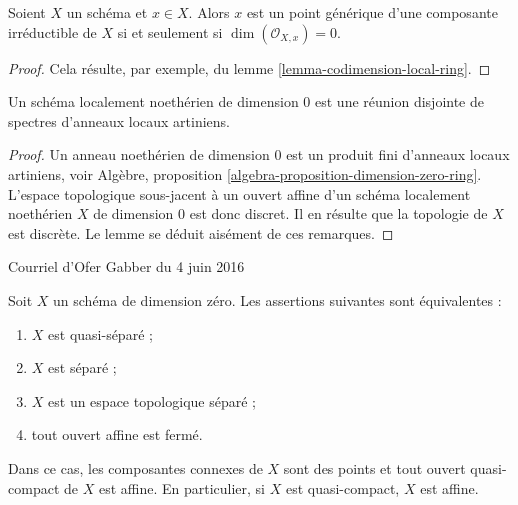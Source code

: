 \begin{lemma}
\label{lemma-generic-point}
Soient $X$ un schéma et $x \in X$. Alors $x$ est un point générique
d'une composante irréductible de $X$ si et seulement si $\dim(\mathcal{O}_{X, x}) = 0$.
\end{lemma}

\begin{proof}
Cela résulte, par exemple, du lemme \ref{lemma-codimension-local-ring}.
\end{proof}

\begin{lemma}
\label{lemma-locally-Noetherian-dimension-0}
Un schéma localement noethérien de dimension $0$ est une réunion
disjointe de spectres d'anneaux locaux artiniens.
\end{lemma}

\begin{proof}
Un anneau noethérien de dimension $0$ est un produit fini d'anneaux locaux
artiniens,
voir Algèbre, proposition \ref{algebra-proposition-dimension-zero-ring}.
L'espace topologique sous-jacent à un ouvert affine d'un schéma localement noethérien $X$ de dimension
$0$ est donc discret. Il en résulte que la
topologie de $X$ est discrète. Le lemme se déduit aisément de ces
remarques.
\end{proof}

\begin{lemma}
\label{lemma-dimension-zero}
\begin{reference}
Courriel d'Ofer Gabber du 4 juin 2016
\end{reference}
Soit $X$ un schéma de dimension zéro. Les assertions suivantes sont équivalentes :
\begin{enumerate}
\item $X$ est quasi-séparé ;
\item $X$ est séparé ;
\item $X$ est un espace topologique séparé ;
\item tout ouvert affine est fermé.
\end{enumerate}
Dans ce cas, les composantes connexes de $X$ sont des points et tout
ouvert quasi-compact de $X$ est affine. En particulier, si $X$
est quasi-compact, $X$ est affine.
\end{lemma}

